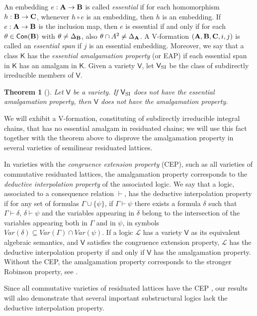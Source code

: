 \documentclass{amsart}
\newtheorem{theorem}{Theorem}[section]
\theoremstyle{definition}
\numberwithin{equation}{section}
\newcommand{\alg}[1]{{\textbf{\upshape #1}}}  %
\newcommand{\vv}[1]{\mathsf {#1}}
\newcommand{\cc}[1]{\mathcal{#1}}
\newcommand{\si}{{\rm SI}}
\begin{document}
An embedding $e: \alg A \to \alg B$ is called {\em essential} if for each homomorphism $h: \alg B \to \alg C$, whenever $h \circ e $ is an embedding, then $h$ is an embedding. If $e : \alg A \to \alg B$ is the inclusion map, then $e$ is essential if and only if for each $\theta \in \vv{Con}(\alg B)$ with $\theta \neq \Delta_{\alg B}$, also $\theta \cap A^2 \neq \Delta_{\alg A}$. A V-formation $(\alg A, \alg B, \alg C, i, j)$ is called an {\em essential span} if $j$ is an essential embedding. Moreover, we say that a class $\vv K$ has the {\em essential amalgamation property} (or EAP) if each essential span in $\vv K$ has an amalgam in $\vv K$.
Given a variety $\vv V$, let $\vv V_{\si}$ be the class of subdirectly irreducible members of $\vv V$. 
\begin{theorem}[{{\cite[Corollary 3.10]{FussnerSantschi24}}}]\label{thm:fussnersantchi}
	Let $\vv V$ be a variety. If $\vv V_{\si}$ does not have the essential amalgamation property, then $\vv V$ does not have the amalgamation property.
\end{theorem}
We will exhibit a V-formation, constituting of subdirectly irreducible integral chains, that has no essential amalgam in residuated chains; we will use this fact together with the theorem above to disprove the amalgamation property in several varieties of semilinear residuated lattices.


In varieties with the {\em congruence extension property} (CEP), such as all varieties of commutative residuated lattices, the amalgamation property corresponds to the {\em deductive interpolation property} of the associated logic. 
We say that a logic, associated to a consequence relation $\vdash$, has the deductive interpolation property if for any set of formulas $\Gamma \cup \{\psi \}$, if $\Gamma \vdash \psi$ there exists a formula $\delta$ such that $\Gamma\vdash \delta$, $\delta \vdash \psi$ and the variables appearing in $\delta$ belong to the intersection of the variables appearing both in $\Gamma$ and in $\psi$, in symbols $Var(\delta) \subseteq Var(\Gamma) \cap Var(\psi)$. 
If a logic $\cc L$ has a variety $\vv V$ as its equivalent algebraic semantics, and $\vv V$ satisfies the congruence extension property, $\cc L$ has the deductive interpolation property if and only if $\vv V$ has the amalgamation property. Without the CEP, the amalgamation property corresponds to the stronger Robinson property, see \cite{MMT2014}. 

Since all commutative varieties of residuated lattices have the CEP \cite[Lemma 3.57]{GJKO}, our results will also demonstrate that several important substructural logics lack the deductive interpolation property.
\end{document}
